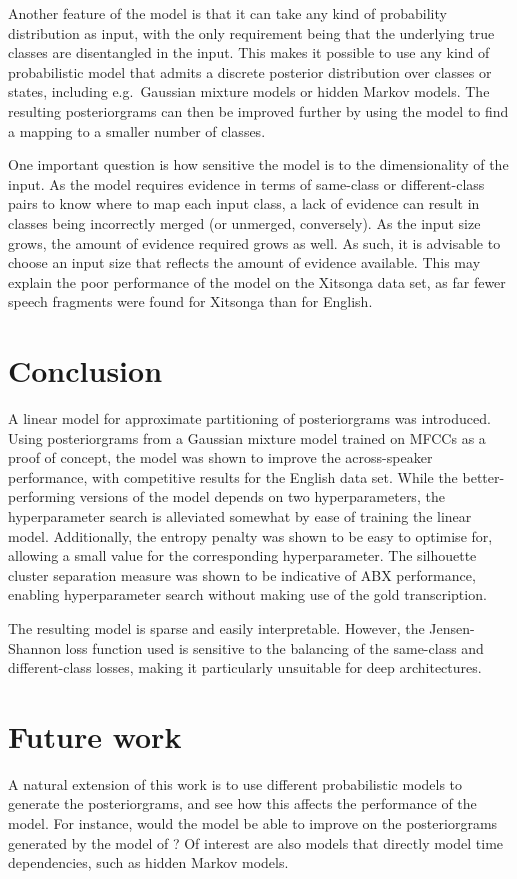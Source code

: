 Another feature of the model is that it can take any kind of probability distribution as input, with the only requirement being that the underlying true classes are disentangled in the input.
This makes it possible to use any kind of probabilistic model that admits a discrete posterior distribution over classes or states, including e.g.\ Gaussian mixture models or hidden Markov models.
The resulting posteriorgrams can then be improved further by using the model to find a mapping to a smaller number of classes.

One important question is how sensitive the model is to the dimensionality of the input.
As the model requires evidence in terms of same-class or different-class pairs to know where to map each input class, a lack of evidence can result in classes being incorrectly merged (or unmerged, conversely).
As the input size grows, the amount of evidence required grows as well.
As such, it is advisable to choose an input size that reflects the amount of evidence available.
This may explain the poor performance of the model on the Xitsonga data set, as far fewer speech fragments were found for Xitsonga than for English.

\section{Conclusion}
A linear model for approximate partitioning of posteriorgrams was introduced.
Using posteriorgrams from a Gaussian mixture model trained on MFCCs as a proof of concept, the model was shown to improve the across-speaker performance, with competitive results for the English data set.
While the better-performing versions of the model depends on two hyperparameters, the hyperparameter search is alleviated somewhat by ease of training the linear model.
Additionally, the entropy penalty was shown to be easy to optimise for, allowing a small value for the corresponding hyperparameter.
The silhouette cluster separation measure was shown to be indicative of ABX performance, enabling hyperparameter search without making use of the gold transcription.

The resulting model is sparse and easily interpretable.
However, the Jensen-Shannon loss function used is sensitive to the balancing of the same-class and different-class losses, making it particularly unsuitable for deep architectures.

\section{Future work}
A natural extension of this work is to use different probabilistic models to generate the posteriorgrams, and see how this affects the performance of the model.
For instance, would the model be able to improve on the posteriorgrams generated by the model of \textcite{chen2015parallel}?
Of interest are also models that directly model time dependencies, such as hidden Markov models.

